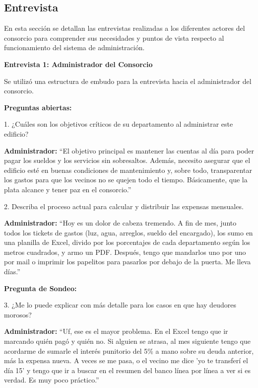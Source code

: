 \subsection{Entrevista}

En esta sección se detallan las entrevistas realizadas a los diferentes actores del consorcio para comprender sus necesidades y puntos de vista respecto al funcionamiento del sistema de administración.

\vspace{0.3cm}
\textbf{Entrevista 1: Administrador del Consorcio}

Se utilizó una estructura de embudo para la entrevista hacia el administrador del consorcio.  

\textbf{Preguntas abiertas:}

1. ¿Cuáles son los objetivos críticos de su departamento al administrar este edificio?

\textbf{Administrador:} ``El objetivo principal es mantener las cuentas al día para poder pagar los sueldos y los servicios sin sobresaltos. Además, necesito asegurar que el edificio esté en buenas condiciones de mantenimiento y, sobre todo, transparentar los gastos para que los vecinos no se quejen todo el tiempo. Básicamente, que la plata alcance y tener paz en el consorcio.'' 

2. Describa el proceso actual para calcular y distribuir las expensas mensuales.

\textbf{Administrador:} ``Hoy es un dolor de cabeza tremendo. A fin de mes, junto todos los tickets de gastos (luz, agua, arreglos, sueldo del encargado), los sumo en una planilla de Excel, divido por los porcentajes de cada departamento según los metros cuadrados, y armo un PDF. Después, tengo que mandarlos uno por uno por mail o imprimir los papelitos para pasarlos por debajo de la puerta. Me lleva días.''   

\textbf{Pregunta de Sondeo:} 

3. ¿Me lo puede explicar con más detalle para los casos en que hay deudores morosos? 

\textbf{Administrador:} ``Uf, ese es el mayor problema. En el Excel tengo que ir marcando quién pagó y quién no. Si alguien se atrasa, al mes siguiente tengo que acordarme de sumarle el interés punitorio del 5\% a mano sobre su deuda anterior, más la expensa nueva. A veces se me pasa, o el vecino me dice 'yo te transferí el día 15' y tengo que ir a buscar en el resumen del banco línea por línea a ver si es verdad. Es muy poco práctico.''   

